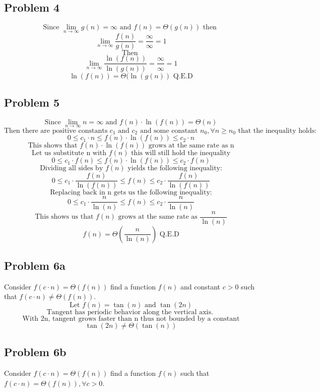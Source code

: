 \documentclass{article}
\begin{document}
\subsection{Problem 4}

$$\text{Since } \lim_{n \rightarrow \infty} g(n) = \infty \text{ and } f(n) = \Theta(g(n)) \text{ then } $$
$$\lim_{n \rightarrow \infty} \frac{f(n)}{g(n)} = \frac{\infty}{\infty} = 1$$
$$\text{Then }$$
$$\lim_{n \rightarrow \infty} \frac{\ln(f(n))}{\ln(g(n))} = \frac{\infty}{\infty} = 1$$
$$\ln(f(n)) = \Theta(\ln(g(n)) \text{ Q.E.D}$$

\subsection{Problem 5}

$$\text{Since } \lim_{n \rightarrow \infty} n = \infty \text{ and } f(n) \cdot \ln(f(n)) = \Theta(n) $$
$$\text{Then there are positive constants } c_1 \text{ and } c_2 \text{ and some constant } n_0, \forall n \ge n_0 \text{ that the inequality holds:}$$
$$0 \le c_1 \cdot n \le f(n) \cdot \ln(f(n)) \le c_2 \cdot n$$
$$\text{This shows that } f(n)\cdot\ln(f(n)) \text{ grows at the same rate as n}$$
$$\text{Let us substitute n with } f(n) \text{ this will still hold the inequality}$$
$$0 \le c_1 \cdot f(n) \le f(n) \cdot \ln(f(n)) \le c_2 \cdot f(n)$$
$$\text{Dividing all sides by } f(n) \text{ yields the following inequality:}$$
$$0 \le c_1 \cdot \frac{f(n)}{\ln(f(n))} \le f(n) \le c_2 \cdot \frac{f(n)}{\ln(f(n))}$$
$$\text{Replacing back in n gets us the following inequality:}$$
$$0 \le c_1 \cdot \frac{n}{\ln(n)} \le f(n) \le c_2 \cdot \frac{n}{\ln(n)}$$
$$\text{This shows us that } f(n) \text{ grows at the same rate as } \frac{n}{\ln(n)}$$
$$f(n) = \Theta(\frac{n}{\ln(n)}) \text{ Q.E.D}$$

\subsection{Problem 6a}
Consider $f(c\cdot n) = \Theta(f(n))$ find a function $f(n)$ and constant $c > 0$ such that $f(c \cdot n) \neq \Theta(f(n))$.
$$\text{Let } f(n) = \tan(n) \text{ and } \tan(2n)$$
$$\text{Tangent has periodic behavior along the vertical axis. }$$
$$\text{With 2n, tangent grows faster than n thus not bounded by a constant}$$
$$\tan(2n) \neq \Theta(\tan(n))$$

\subsection{Problem 6b}
Consider $f(c\cdot n) = \Theta(f(n))$ find a function $f(n)$ such that $f(c \cdot n) = \Theta(f(n)), \forall c > 0$.
\end{document}
